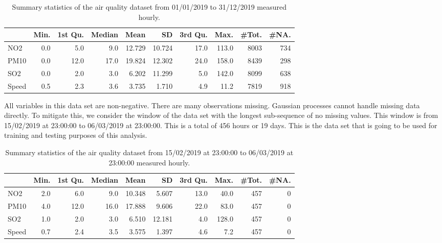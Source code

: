       \begin{table}[ht]
         \centering
         \begin{tabular}{lrrrrrrrrr}
            \toprule
                  & Min. & 1st Qu. & Median & Mean   & SD     & 3rd Qu. & Max.  & \#Tot. & \#NA. \\
            \midrule
            NO2     & 0.0  & 5.0     & 9.0    & 12.729 & 10.724 & 17.0    & 113.0 & 8003   & 734   \\
            PM10    & 0.0  & 12.0    & 17.0   & 19.824 & 12.302 & 24.0    & 158.0 & 8439   & 298   \\
            SO2     & 0.0  & 2.0     & 3.0    & 6.202  & 11.299 & 5.0     & 142.0 & 8099   & 638   \\
            Speed   & 0.5  & 2.3     & 3.6    & 3.735  & 1.710  & 4.9     & 11.2  & 7819   & 918   \\
            \bottomrule
         \end{tabular}
         \caption{Summary statistics of the air quality dataset from 01/01/2019 to 31/12/2019 measured hourly.}
         \label{tab:summary_stats}
      \end{table}

      All variables in this data set are non-negative. There are many observations missing. Gaussian processes cannot handle missing data directly. To mitigate this, we consider the window of the data set with the longest sub-sequence of no missing values. This window is from 15/02/2019 at 23:00:00 to 06/03/2019 at 23:00:00. This is a total of 456 hours or 19 days. This is the data set that is going to be used for training and testing purposes of this analysis.

      \begin{table}[ht]
      \centering
      \begin{tabular}{lrrrrrrrrr}
         \toprule
               & Min. & 1st Qu. & Median & Mean  & SD    & 3rd Qu. & Max. & \#Tot. & \#NA. \\
         \midrule
         NO2    & 2.0  & 6.0     & 9.0    & 10.348 & 5.607 & 13.0    & 40.0 & 457    & 0     \\
         PM10   & 4.0  & 12.0    & 16.0   & 17.888 & 9.606 & 22.0    & 83.0 & 457    & 0     \\
         SO2    & 1.0  & 2.0     & 3.0    & 6.510  & 12.181 & 4.0    & 128.0 & 457   & 0     \\
         Speed  & 0.7  & 2.4     & 3.5    & 3.575  & 1.397 & 4.6     & 7.2  & 457    & 0     \\
         \bottomrule
      \end{tabular}
      \caption{Summary statistics of the air quality dataset from 15/02/2019 at 23:00:00 to 06/03/2019 at 23:00:00 measured hourly.}
      \label{tab:summary_stats2}
      \end{table}

